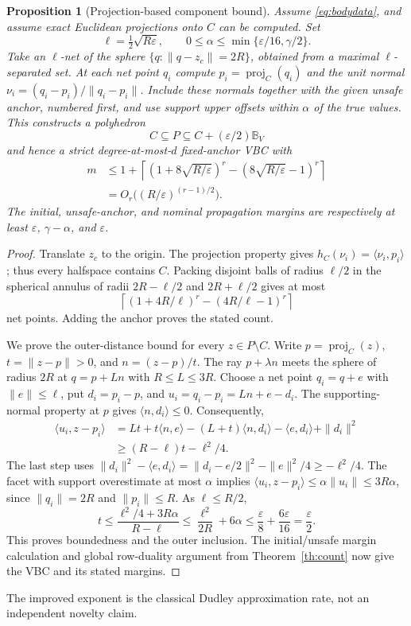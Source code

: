 \documentclass[journal,10pt]{IEEEtran}
\newtheorem{proposition}{Proposition}
\theoremstyle{definition}\newtheorem{definition}{Definition}
\theoremstyle{remark}
\newcommand{\ball}{\mathbb B_V}
\begin{document}
\begin{proposition}[Projection-based component bound]\label{prop:projection}
Assume \eqref{eq:bodydata}, and assume exact Euclidean projections onto $C$ can be computed. Set
\[
 \ell=\tfrac12\sqrt{R\varepsilon},\qquad
 0\leq\alpha\leq\min\{\varepsilon/16,\gamma/2\}.
\]
Take an $\ell$-net of the sphere $\{q:\|q-z_c\|=2R\}$, obtained from a maximal $\ell$-separated set. At each net point $q_i$ compute $p_i=\operatorname{proj}_C(q_i)$ and the unit normal
$\nu_i=(q_i-p_i)/\|q_i-p_i\|$. Include these normals together with the given unsafe anchor, numbered first, and use support upper offsets within $\alpha$ of the true values. This constructs a polyhedron
\[
 C\subseteq P\subseteq C+(\varepsilon/2)\ball
\]
and hence a strict degree-at-most-$d$ fixed-anchor VBC with
\begin{equation}\label{eq:projection-count}
\begin{aligned}
 m&\leq1+\left\lceil(1+8\sqrt{R/\varepsilon})^r
 -(8\sqrt{R/\varepsilon}-1)^r\right\rceil\\
 &=O_r\bigl((R/\varepsilon)^{(r-1)/2}\bigr).
\end{aligned}
\end{equation}
The initial, unsafe-anchor, and nominal propagation margins are respectively at least $\varepsilon$, $\gamma-\alpha$, and $\varepsilon$.
\end{proposition}
\begin{proof}
Translate $z_c$ to the origin. The projection property gives
$h_C(\nu_i)=\langle \nu_i,p_i\rangle$; thus every halfspace contains $C$.
Packing disjoint balls of radius $\ell/2$ in the spherical annulus of radii $2R-\ell/2$ and $2R+\ell/2$ gives at most
\[
 \left\lceil(1+4R/\ell)^r-(4R/\ell-1)^r\right\rceil
\]
net points. Adding the anchor proves the stated count.

We prove the outer-distance bound for every $z\in P\setminus C$.
Write $p=\operatorname{proj}_C(z)$, $t=\|z-p\|>0$, and $n=(z-p)/t$.
The ray $p+\lambda n$ meets the sphere of radius $2R$ at
$q=p+Ln$ with $R\leq L\leq3R$.
Choose a net point $q_i=q+e$ with $\|e\|\leq\ell$, put $d_i=p_i-p$, and
$u_i=q_i-p_i=Ln+e-d_i$.
The supporting-normal property at $p$ gives $\langle n,d_i\rangle\leq0$.
Consequently,
\begin{align*}
 \langle u_i,z-p_i\rangle
 &=Lt+t\langle n,e\rangle-(L+t)\langle n,d_i\rangle
       -\langle e,d_i\rangle+\|d_i\|^2\\
 &\geq (R-\ell)t-\ell^2/4.
\end{align*}
The last step uses
$\|d_i\|^2-\langle e,d_i\rangle
=\|d_i-e/2\|^2-\|e\|^2/4\geq-\ell^2/4$.
The facet with support overestimate at most $\alpha$ implies
$\langle u_i,z-p_i\rangle\leq\alpha\|u_i\|\leq3R\alpha$,
since $\|q_i\|=2R$ and $\|p_i\|\leq R$.
As $\ell\leq R/2$,
\[
 t\leq\frac{\ell^2/4+3R\alpha}{R-\ell}
 \leq\frac{\ell^2}{2R}+6\alpha
 \leq\frac{\varepsilon}{8}+\frac{6\varepsilon}{16}
 =\frac{\varepsilon}{2}.
\]
This proves boundedness and the outer inclusion. The initial/unsafe margin calculation and global row-duality argument from Theorem~\ref{th:count} now give the VBC and its stated margins.
\end{proof}
The improved exponent is the classical Dudley approximation rate, not an independent novelty claim.
\end{document}
